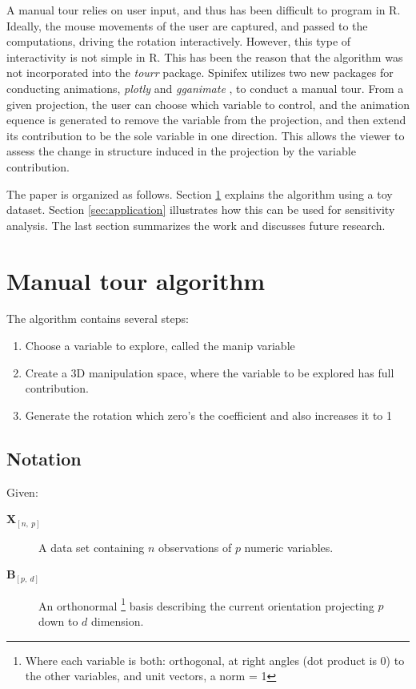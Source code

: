\documentclass{monashthesis}
\begin{document}
A manual tour relies on user input, and thus has been difficult to program in R. Ideally, the mouse movements of the user are captured, and passed to the computations, driving the rotation interactively. However, this type of interactivity is not simple in R. This has been the reason that the algorithm was not incorporated into the \emph{tourr} package. Spinifex utilizes two new packages for conducting animations, \emph{plotly} \autocite{sievert_plotly_2018} and \emph{gganimate} \autocite{pedersen_gganimate:_2019}, to conduct a manual tour. From a given projection, the user can choose which variable to control, and the animation equence is generated to remove the variable from the projection, and then extend its contribution to be the sole variable in one direction. This allows the viewer to assess the change in structure induced in the projection by the variable contribution.

The paper is organized as follows. Section \ref{sec:algorithm} explains the algorithm using a toy dataset. Section \ref{sec:application} illustrates how this can be used for sensitivity analysis. The last section summarizes the work and discusses future research.

\hypertarget{sec:algorithm}{%
\section{Manual tour algorithm}\label{sec:algorithm}}

The algorithm contains several steps:

\begin{enumerate}
\def\labelenumi{\arabic{enumi}.}
\tightlist
\item
  Choose a variable to explore, called the manip variable
\item
  Create a 3D manipulation space, where the variable to be explored has full contribution.
\item
  Generate the rotation which zero's the coefficient and also increases it to 1
\end{enumerate}

\hypertarget{notation}{%
\subsection{Notation}\label{notation}}

Given:

\begin{description}
  \item[$\textbf{X}_{[n,~p]}$] A data set containing $n$ observations of $p$ numeric variables. 
  \item[$\textbf{B}_{[p,~d]}$] An orthonormal \footnote{Where each variable is both: orthogonal, at right angles (dot product is 0) to the other variables, and unit vectors, a norm = 1} basis describing the current orientation projecting $p$ down to $d$ dimension.
\end{description}
\end{document}
